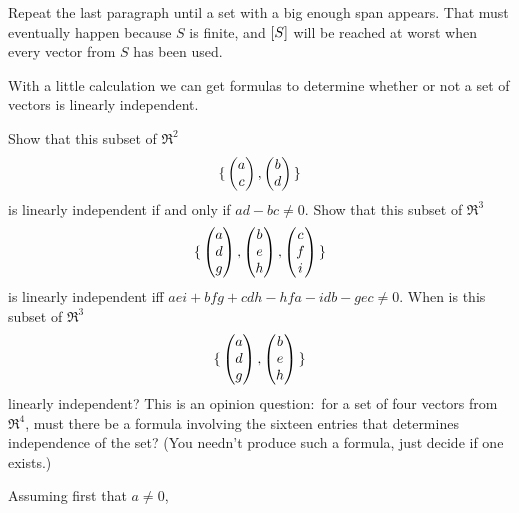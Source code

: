 \begin{exercises}
\begin{answer}
\begin{exparts}
           Repeat the last paragraph until a set with a big enough
           span appears.
           That must eventually happen
           because \( S \) is finite, and
           \( \relax [S\relax ] \) will be reached at worst when every vector from
           \( S \) has been used.
      \end{exparts}  
    \end{answer}
  \item 
     With a little calculation we can get formulas to determine whether or
     not a set of vectors is linearly independent. 
     \begin{exparts}
       \partsitem Show that this subset of \( \Re^2 \)
         \begin{equation*}
           \mbox{$\{\,\begin{pmatrix} a \\ c \end{pmatrix},\begin{pmatrix} b \\ d \end{pmatrix}\,\}$}
         \end{equation*}
         is linearly independent if and only if \( ad-bc\neq 0 \).
       \partsitem Show that this subset of \( \Re^3 \)
         \begin{equation*}
           \mbox{$\{\,\begin{pmatrix} a \\ d \\ g \end{pmatrix},
                \begin{pmatrix} b \\ e \\ h \end{pmatrix},
                \begin{pmatrix} c \\ f \\ i \end{pmatrix}  \,\}$}
         \end{equation*}
         is linearly independent iff
         \( aei+bfg+cdh-hfa-idb-gec \neq 0 \).
       \partsitem When is this subset of \( \Re^3 \)
         \begin{equation*}
           \mbox{$\{\,\begin{pmatrix} a \\ d \\ g \end{pmatrix},
                \begin{pmatrix} b \\ e \\ h \end{pmatrix} \,\}$}
         \end{equation*}
         linearly independent?
       \partsitem This is an opinion question:~for
         a set of four vectors from \( \Re^4 \),
         must there be a formula involving the sixteen entries 
         that determines independence of the set?
         (You needn't produce such a formula, just decide if one exists.)
    \end{exparts}
    \begin{answer}
      \begin{exparts}
        \partsitem 
          Assuming first that \( a\neq 0 \),

\end{exparts}
\end{answer}
\end{exercises}

